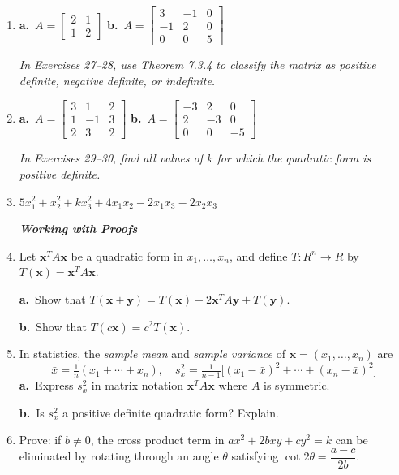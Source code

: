\documentclass{article}
\begin{document}
\begin{enumerate}
\item[26.] \textbf{a.}\ $A=\begin{bmatrix}2&1\\1&2\end{bmatrix}$
\hspace{20pt}
\textbf{b.}\ $A=\begin{bmatrix}3&-1&0\\-1&2&0\\0&0&5\end{bmatrix}$

\noindent\textit{In Exercises 27--28, use Theorem 7.3.4 to classify the matrix as positive
definite, negative definite, or indefinite.}

\item[27.] \textbf{a.}\ $A=\begin{bmatrix}3&1&2\\1&-1&3\\2&3&2\end{bmatrix}$
\hspace{20pt}
\textbf{b.}\ $A=\begin{bmatrix}-3&2&0\\2&-3&0\\0&0&-5\end{bmatrix}$

\noindent\textit{In Exercises 29--30, find all values of $k$ for which the quadratic form is
positive definite.}

\item[29.] $5x_1^2+x_2^2+kx_3^2+4x_1x_2-2x_1x_3-2x_2x_3$

\noindent\textit{\textbf{Working with Proofs}}

\item[31.] Let $\mathbf{x}^T A\mathbf{x}$ be a quadratic form in $x_1,\ldots,x_n$, and define
$T\colon R^n\to R$ by $T(\mathbf{x})=\mathbf{x}^T A\mathbf{x}$.

\textbf{a.}\ Show that $T(\mathbf{x}+\mathbf{y})=T(\mathbf{x})+2\mathbf{x}^T A\mathbf{y}+T(\mathbf{y})$.

\textbf{b.}\ Show that $T(c\mathbf{x})=c^2T(\mathbf{x})$.

\item[33.] In statistics, the \emph{sample mean} and \emph{sample variance} of $\mathbf{x}=(x_1,\ldots,x_n)$ are
\[
  \bar{x}=\tfrac{1}{n}(x_1+\cdots+x_n),\quad
  s_x^2=\tfrac{1}{n-1}\bigl[(x_1-\bar{x})^2+\cdots+(x_n-\bar{x})^2\bigr]
\]
\textbf{a.}\ Express $s_x^2$ in matrix notation $\mathbf{x}^T A\mathbf{x}$ where $A$ is symmetric.

\textbf{b.}\ Is $s_x^2$ a positive definite quadratic form? Explain.

\item[36.] Prove: if $b\neq0$, the cross product term in $ax^2+2bxy+cy^2=k$ can be eliminated by
rotating through an angle $\theta$ satisfying $\cot 2\theta=\dfrac{a-c}{2b}$.

\end{enumerate}
\end{document}
